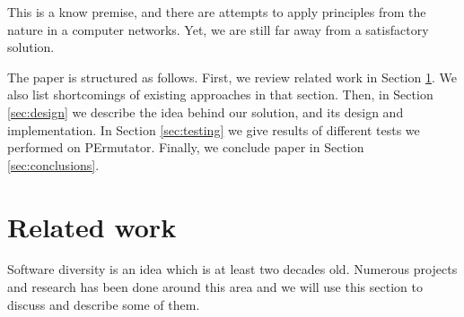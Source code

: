 \documentclass[11pt,final,conference,a4paper]{IEEEtran}
\begin{document}
This is a know premise, and there are attempts to apply principles
from the nature in a computer networks. Yet, we are still far away
from a satisfactory solution.

The paper is structured as follows. First, we review related work
in Section \ref{sec:architecture}. We also list shortcomings of
existing approaches in that section. Then, in Section \ref{sec:design}
we describe the idea behind our solution, and its design and
implementation. In Section \ref{sec:testing} we give results of
different tests we performed on PErmutator. Finally, we conclude
paper in Section \ref{sec:conclusions}.

\section{Related work}
\label{sec:architecture}
Software diversity is an idea which is at least two decades old. Numerous projects and research has been done around this area and we will use this section to discuss and describe some of them.
\end{document}
